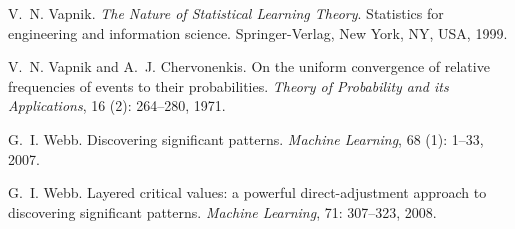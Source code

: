 \begin{thebibliography}{42}
V.~N. Vapnik.
\newblock \emph{The Nature of Statistical Learning Theory}.
\newblock Statistics for engineering and information science. Springer-Verlag,
  New York, NY, USA, 1999.

V.~N. Vapnik and A.~J. Chervonenkis.
\newblock On the uniform convergence of relative frequencies of events to their
  probabilities.
\newblock \emph{Theory of Probability and its Applications}, 16
  (2): 264--280, 1971.

G.~I. Webb.
\newblock Discovering significant patterns.
\newblock \emph{Machine Learning}, 68 (1): 1--33, 2007.

G.~I. Webb.
\newblock Layered critical values: a powerful direct-adjustment approach to
  discovering significant patterns.
\newblock \emph{Machine Learning}, 71: 307--323, 2008.

\end{thebibliography}

